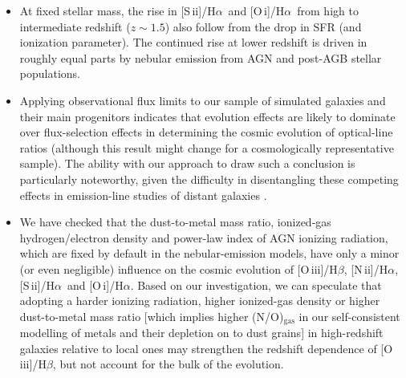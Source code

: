 \documentclass[fleqn,usenatbib]{mnras}
\newcommand{\oiiihb}{\hbox{[O\,{\sc iii}]/H$\beta$}}
\newcommand{\niiha}{\hbox{[N\,{\sc ii}]/H$\alpha$}}
\newcommand{\siiha}{\hbox{[S\,{\sc ii}]/H$\alpha$}}
\newcommand{\oiha}{\hbox{[O\,{\sc i}]/H$\alpha$}}
\begin{document}
\begin{itemize}
which reduces the probability of multiply ionizing nitrogen at the expense 
of N$^+$. At redshift $z<1$, a drop in average central gas density and 
rise in BHAR/SFR ratio make the contribution by AGN emission 
contribute more significantly to the cosmic evolution of \niiha. Nebular
emission from post-AGB stellar populations hardly affects this evolution.
\item At fixed stellar mass, the rise in \siiha\ and \oiha\ from high to 
intermediate redshift ($z\sim1.5$) also follow from the drop in SFR (and
ionization parameter). The continued rise at lower redshift is driven
in roughly equal parts by nebular emission from AGN and post-AGB
stellar populations.
\item Applying observational flux limits to our sample of simulated 
galaxies and their main progenitors indicates that evolution effects 
are likely to dominate over flux-selection effects in determining
the cosmic evolution of optical-line ratios (although this result might 
change for a cosmologically representative sample). The ability with our approach 
to draw such a conclusion is particularly noteworthy, given the difficulty 
in disentangling these competing effects in emission-line studies of distant 
galaxies \citep{Juneau14}.  
\item We have checked that the dust-to-metal mass ratio, ionized-gas 
hydrogen/electron density and power-law index of AGN ionizing radiation, 
which are fixed by default in the nebular-emission models, have only a
minor (or even negligible) influence on the cosmic evolution of \oiiihb,
\niiha, \siiha\ and \oiha. Based on our investigation, we can speculate 
that adopting a harder ionizing radiation, higher ionized-gas density or
higher dust-to-metal mass ratio [which implies higher (N/O)$_\mathrm{gas}$
in our self-consistent modelling of metals and their depletion
on to dust grains] in high-redshift galaxies relative to local ones
may strengthen the redshift dependence of \oiiihb, but not account for
the bulk of the evolution.
\end{itemize}
\end{document}
